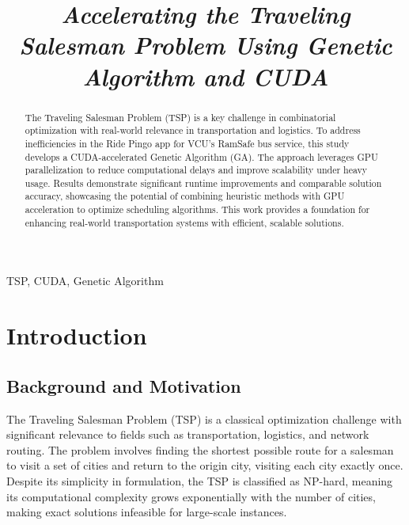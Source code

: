 \documentclass[conference]{IEEEtran}
\begin{document}
\title{\textit{Accelerating the Traveling Salesman Problem Using Genetic Algorithm and CUDA}\\
}

\author{

}

\maketitle
\begin{abstract}
    The Traveling Salesman Problem (TSP) is a key challenge in combinatorial optimization with real-world relevance in transportation and logistics. To address inefficiencies in the Ride Pingo app for VCU’s RamSafe bus service, this study develops a CUDA-accelerated Genetic Algorithm (GA). The approach leverages GPU parallelization to reduce computational delays and improve scalability under heavy usage. Results demonstrate significant runtime improvements and comparable solution accuracy, showcasing the potential of combining heuristic methods with GPU acceleration to optimize scheduling algorithms. This work provides a foundation for enhancing real-world transportation systems with efficient, scalable solutions.
\end{abstract}

\begin{IEEEkeywords}
    TSP, CUDA, Genetic Algorithm
\end{IEEEkeywords}

\section{Introduction}

\subsection{Background and Motivation}

The Traveling Salesman Problem (TSP) is a classical optimization challenge with significant relevance to fields such as transportation, logistics, and network routing. The problem involves finding the shortest possible route for a salesman to visit a set of cities and return to the origin city, visiting each city exactly once. Despite its simplicity in formulation, the TSP is classified as NP-hard, meaning its computational complexity grows exponentially with the number of cities, making exact solutions infeasible for large-scale instances.
\end{document}
